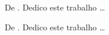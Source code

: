 \begin{dedicatoria}
\vspace*{\fill}
\vspace*{\fill}
\vspace*{\fill}
\vspace*{\fill}
\vspace*{\fill}
\vspace*{\fill}
De \imprimirAutorUm.
\newline
Dedico este trabalho \ldots 

\vspace*{\fill}
De \imprimirAutorDois.
\newline
Dedico este trabalho \ldots

\end{dedicatoria}
